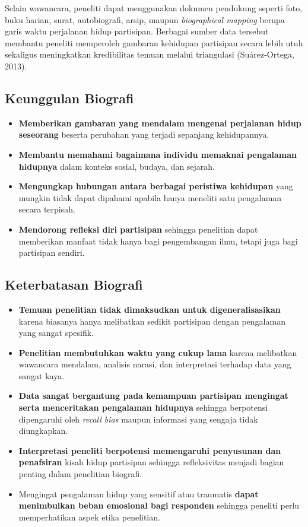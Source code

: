 \documentclass[
  indonesian,
  letterpaper,
  DIV=11,
  numbers=noendperiod]{scrreprt}
\providecommand{\tightlist}{%
  \setlength{\itemsep}{0pt}\setlength{\parskip}{0pt}}
\begin{document}
Selain wawancara, peneliti dapat menggunakan dokumen pendukung seperti
foto, buku harian, surat, autobiografi, arsip, maupun \emph{biographical
mapping} berupa garis waktu perjalanan hidup partisipan. Berbagai sumber
data tersebut membantu peneliti memperoleh gambaran kehidupan partisipan
secara lebih utuh sekaligus meningkatkan kredibilitas temuan melalui
triangulasi (Suárez-Ortega, 2013).

\subsection{Keunggulan Biografi}\label{keunggulan-biografi}

\begin{itemize}
\tightlist
\item
  \textbf{Memberikan gambaran yang mendalam mengenai perjalanan hidup
  seseorang} beserta perubahan yang terjadi sepanjang kehidupannya.
\item
  \textbf{Membantu memahami bagaimana individu memaknai pengalaman
  hidupnya} dalam konteks sosial, budaya, dan sejarah.
\item
  \textbf{Mengungkap hubungan antara berbagai peristiwa kehidupan} yang
  mungkin tidak dapat dipahami apabila hanya meneliti satu pengalaman
  secara terpisah.
\item
  \textbf{Mendorong refleksi diri partisipan} sehingga penelitian dapat
  memberikan manfaat tidak hanya bagi pengembangan ilmu, tetapi juga
  bagi partisipan sendiri.
\end{itemize}

\subsection{Keterbatasan Biografi}\label{keterbatasan-biografi}

\begin{itemize}
\tightlist
\item
  \textbf{Temuan penelitian tidak dimaksudkan untuk digeneralisasikan}
  karena biasanya hanya melibatkan sedikit partisipan dengan pengalaman
  yang sangat spesifik.
\item
  \textbf{Penelitian membutuhkan waktu yang cukup lama} karena
  melibatkan wawancara mendalam, analisis narasi, dan interpretasi
  terhadap data yang sangat kaya.
\item
  \textbf{Data sangat bergantung pada kemampuan partisipan mengingat
  serta menceritakan pengalaman hidupnya} sehingga berpotensi
  dipengaruhi oleh \emph{recall bias} maupun informasi yang sengaja
  tidak diungkapkan.
\item
  \textbf{Interpretasi peneliti berpotensi memengaruhi penyusunan dan
  penafsiran} kisah hidup partisipan sehingga refleksivitas menjadi
  bagian penting dalam penelitian biografi.
\item
  Mengingat pengalaman hidup yang sensitif atau traumatis \textbf{dapat
  menimbulkan beban emosional bagi responden} sehingga peneliti perlu
  memperhatikan aspek etika penelitian.
\end{itemize}
\end{document}
